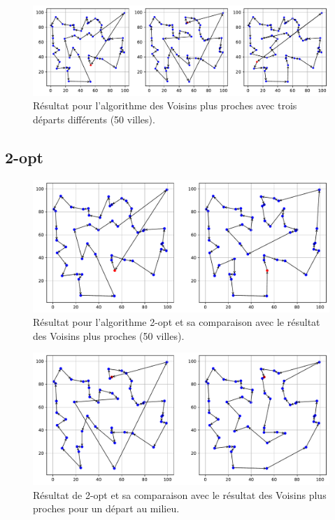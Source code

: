 \documentclass[a4paper,11pt,fleqn]{article}
\begin{document}
\begin{figure}[H]
    \centering
    \includegraphics[width=\textwidth]{images/NN_50_villes_3departs.pdf}
    \caption{Résultat pour l'algorithme des Voisins plus proches avec trois départs différents (50 villes).}
    \label{fig:nn-50}
\end{figure}

\subsection*{2-opt}

\begin{figure}[H]
    \centering
    \includegraphics[width=\textwidth]{images/2opt_50_villes_nn.pdf}
    \caption{Résultat pour l'algorithme 2-opt et sa comparaison avec le résultat des Voisins plus proches (50 villes).}
    \label{fig:2opt-nn}
\end{figure}

\begin{figure}[H]
    \centering
    \includegraphics[width=\textwidth]{images/2opt_50_villes_depart_23.pdf}
    \caption{Résultat de 2-opt et sa comparaison avec le résultat des Voisins plus proches pour un départ au milieu.}
    \label{fig:2opt-dep23}
\end{figure}
\end{document}
